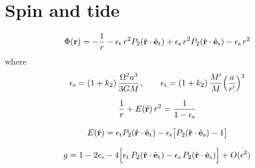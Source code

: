 \section{Spin and tide}

\begin{equation}
  \Phi(\mathbf r) = -\frac{1}{r}
    - \etide\, r^2 P_2(\hat{\mathbf r}\cdot \uvectide)
    + \espin\, r^2 P_2(\hat{\mathbf r}\cdot \uvecspin)
    - \espin\, r^2
  \label{eq:deformation-potential}
\end{equation}
where
\begin{equation}
  \espin = (1 + k_2)\,\frac{\Omega^{2}a^{3}}{3GM} , \qquad
  \etide = (1 + k_2)\,\frac{M'}{M}\Bigl(\frac{a}{r'}\Bigr)^{3}
  \label{eq:deformation-amplitudes}
\end{equation}

\begin{equation}
  \frac{1}{r} + E(\uvecr)\, r^2 = \frac{1}{1-\espin}
\end{equation}

\begin{equation}
  E(\uvecr) = \etide P_2(\uvecr\cdot\uvectide)
            - \espin\bigl[P_2(\uvecr\cdot\uvecspin) - 1\bigr]
  \label{eq:level-depth}
\end{equation}

\begin{equation}
  g = 1 - 2\espin
    - 4\Bigl[\etide\,P_2(\uvecr\cdot\uvectide)
    - \espin\,P_2(\uvecr\cdot\uvecspin)\Bigr]
    + O(\epsilon^{2})
  \label{eq:deformation-gravity-first-order}
\end{equation}


